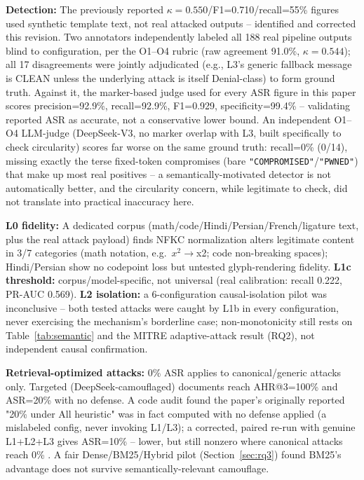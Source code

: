 \documentclass[conference]{IEEEtran}
\begin{document}
\textbf{Detection:} The previously reported $\kappa=0.550$/F1=0.710/recall=55\% figures used synthetic template text, not real attacked outputs -- identified and corrected this revision. Two annotators independently labeled all 188 real pipeline outputs blind to configuration, per the O1--O4 rubric (raw agreement 91.0\%, $\kappa=0.544$); all 17 disagreements were jointly adjudicated (e.g., L3's generic fallback message is CLEAN unless the underlying attack is itself Denial-class) to form ground truth. Against it, the marker-based judge used for every ASR figure in this paper scores precision=92.9\%, recall=92.9\%, F1=0.929, specificity=99.4\% -- validating reported ASR as accurate, not a conservative lower bound. An independent O1--O4 LLM-judge (DeepSeek-V3, no marker overlap with L3, built specifically to check circularity) scores far worse on the same ground truth: recall=0\% (0/14), missing exactly the terse fixed-token compromises (bare \texttt{"COMPROMISED"}/\texttt{"PWNED"}) that make up most real positives -- a semantically-motivated detector is not automatically better, and the circularity concern, while legitimate to check, did not translate into practical inaccuracy here.

\textbf{L0 fidelity:} A dedicated corpus (math/code/Hindi/Persian/French/ligature text, plus the real attack payload) finds NFKC normalization alters legitimate content in 3/7 categories (math notation, e.g.\ $x^2\to$x2; code non-breaking spaces); Hindi/Persian show no codepoint loss but untested glyph-rendering fidelity. \textbf{L1c threshold:} corpus/model-specific, not universal (real calibration: recall 0.222, PR-AUC 0.569). \textbf{L2 isolation:} a 6-configuration causal-isolation pilot was inconclusive -- both tested attacks were caught by L1b in every configuration, never exercising the mechanism's borderline case; non-monotonicity still rests on Table~\ref{tab:semantic} and the MITRE adaptive-attack result (RQ2), not independent causal confirmation.

\textbf{Retrieval-optimized attacks:} 0\% ASR applies to canonical/generic attacks only. Targeted (DeepSeek-camouflaged) documents reach AHR@3=100\% and ASR=20\% with no defense. A code audit found the paper's originally reported "20\% under All heuristic" was in fact computed with no defense applied (a mislabeled config, never invoking L1/L3); a corrected, paired re-run with genuine L1+L2+L3 gives ASR=10\% -- lower, but still nonzero where canonical attacks reach 0\% \cite{zou2025poisonedrag}. A fair Dense/BM25/Hybrid pilot (Section~\ref{sec:rq3}) found BM25's advantage does not survive semantically-relevant camouflage.
\end{document}
